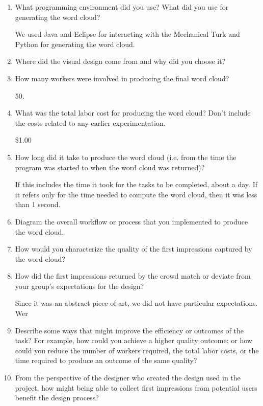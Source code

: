 \documentclass{article}
\begin{document}
\begin{enumerate}

\item What programming environment did you use? What did you use for generating the word cloud?

We used Java and Eclipse for interacting with the Mechanical Turk and Python for generating the word cloud.

\item Where did the visual design come from and why did you choose it?

\item How many workers were involved in producing the final word cloud?

50.

\item What was the total labor cost for producing the word cloud? Don't include the costs related to any earlier experimentation.

\$1.00

\item How long did it take to produce the word cloud (i.e. from the time the program was started to when the word cloud was returned)?

If this includes the time it took for the tasks to be completed, about  a day. If it refers only for the time needed to compute the word cloud, then it was less than 1 second.

\item Diagram the overall workflow or process that you implemented to produce the word cloud.

\item How would you characterize the quality of the first impressions captured by the word cloud?

\item How did the first impressions returned by the crowd match or deviate from your group's expectations for the design?

Since it was an abstract piece of art, we did not have particular expectations. Wer

\item Describe some ways that might improve the efficiency or outcomes of the task? For example, how could you achieve a higher quality outcome; or how could you reduce the number of workers required, the total labor costs, or the time required to produce an outcome of the same quality?

\item From the perspective of the designer who created the design used in the project, how might being able to collect first impressions from potential users benefit the design process?

\end{enumerate}
\end{document}
